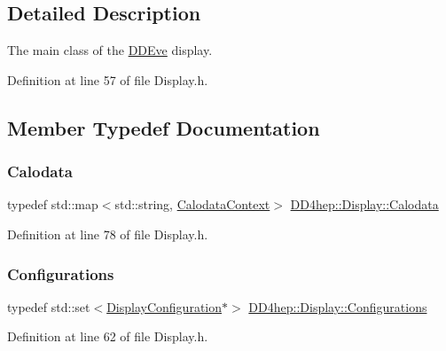 \subsection{Detailed Description}
The main class of the \hyperlink{struct_d_d4hep_1_1_d_d_eve}{D\+D\+Eve} display. 

Definition at line 57 of file Display.\+h.



\subsection{Member Typedef Documentation}
\hypertarget{class_d_d4hep_1_1_display_a692339ace65797a205d2332c4a652598}{}\label{class_d_d4hep_1_1_display_a692339ace65797a205d2332c4a652598} 
\subsubsection{\texorpdfstring{Calodata}{Calodata}}
{\footnotesize\ttfamily typedef std\+::map$<$std\+::string, \hyperlink{struct_d_d4hep_1_1_display_1_1_calodata_context}{Calodata\+Context}$>$ \hyperlink{class_d_d4hep_1_1_display_a692339ace65797a205d2332c4a652598}{D\+D4hep\+::\+Display\+::\+Calodata}}



Definition at line 78 of file Display.\+h.

\hypertarget{class_d_d4hep_1_1_display_a6e411e86cfcb41b915d77edf154265dd}{}\label{class_d_d4hep_1_1_display_a6e411e86cfcb41b915d77edf154265dd} 
\subsubsection{\texorpdfstring{Configurations}{Configurations}}
{\footnotesize\ttfamily typedef std\+::set$<$\hyperlink{class_d_d4hep_1_1_display_configuration}{Display\+Configuration}$\ast$$>$ \hyperlink{class_d_d4hep_1_1_display_a6e411e86cfcb41b915d77edf154265dd}{D\+D4hep\+::\+Display\+::\+Configurations}}



Definition at line 62 of file Display.\+h.

\hypertarget{class_d_d4hep_1_1_display_a79237f24a5b3ec781faa5f8e20579ae0}{}\label{class_d_d4hep_1_1_display_a79237f24a5b3ec781faa5f8e20579ae0} 
